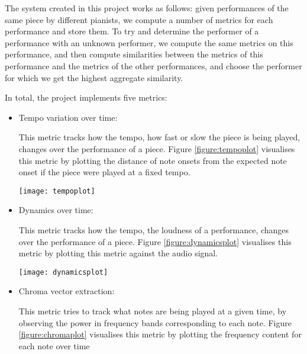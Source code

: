 \documentclass[oneside, class=book, crop=false, 12pt]{standalone}
\begin{document}
The system created in this project works as follows: given performances of the same piece by different pianists, we compute a number of metrics for each performance and store them. To try and determine the performer of a performance with an unknown performer, we compute the same metrics on this performance, and then compute similarities between the metrics of this performance and the metrics of the other performances, and choose the performer for which we get the highest aggregate similarity.

In total, the project implements five metrics:

\begin{itemize}
  \item
    Tempo variation over time:

    This metric tracks how the tempo, how fast or slow the piece is being played, changes over the performance of a piece. Figure \ref{figure:tempoplot} visualises this metric by plotting the distance of note onsets from the expected note onset if the piece were played at a fixed tempo.

\begin{minipage}{\textwidth}
  \centering
  \texttt{[image: tempoplot]}
  \label{figure:tempoplot}
\end{minipage}

  \item
    Dynamics over time:

    This metric tracks how the tempo, the loudness of a performance, changes over the performance of a piece. Figure \ref{figure:dynamicsplot} visualises this metric by plotting this metric against the audio signal.

\begin{minipage}{\textwidth}
  \centering
  \texttt{[image: dynamicsplot]}
  \label{figure:dynamicsplot}
\end{minipage}


  \item
    Chroma vector extraction:

    This metric tries to track what notes are being played at a given time, by observing the power in frequency bands corresponding to each note. Figure \ref{figure:chromaplot} visualises this metric by plotting the frequency content for each note over time


\end{itemize}
\end{document}
